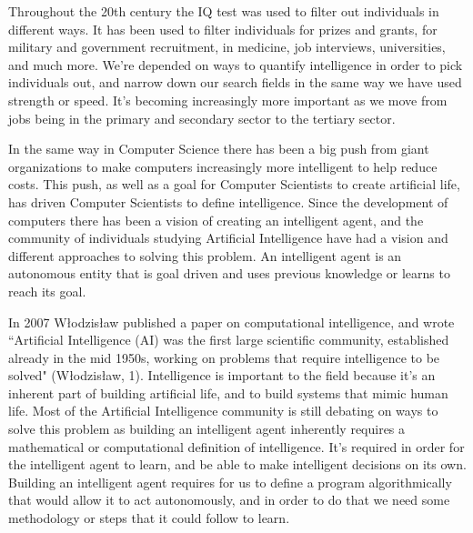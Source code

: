 \documentclass[11pt, oneside]{article}
\begin{document}
\par Throughout the 20th century the IQ test was used to filter out individuals in different ways. It has been used to filter individuals for prizes and grants, for military and government recruitment, in medicine, job interviews, universities, and much more. We're depended on ways to quantify intelligence in order to pick individuals out, and narrow down our search fields in the same way we have used strength or speed. It's becoming increasingly more important as we move from jobs being in the primary and secondary sector to the tertiary sector. 

\par In the same way in Computer Science there has been a big push from giant organizations to make computers increasingly more intelligent to help reduce costs. This push, as well as a goal for Computer Scientists to create artificial life, has driven Computer Scientists to define intelligence. Since the development of computers there has been a vision of creating an intelligent agent, and the community of individuals studying Artificial Intelligence have had a vision and different approaches to solving this problem. An intelligent agent is an autonomous entity that is goal driven and uses previous knowledge or learns to reach its goal.

\par In 2007 W\l{}odzis\l{}aw published a paper on computational intelligence, and wrote ``Artificial Intelligence (AI) was the first large scientific community, established already in the mid 1950s, working on problems that require intelligence to be solved" (W\l{}odzis\l{}aw, 1). Intelligence is important to the field because it's an inherent part of building artificial life, and to build systems that mimic human life. Most of the Artificial Intelligence community is still debating on ways to solve this problem as building an intelligent agent inherently requires a mathematical or computational definition of intelligence. It's required in order for the intelligent agent to learn, and be able to make intelligent decisions on its own. Building an intelligent agent requires for us to define a program algorithmically that would allow it to act autonomously, and in order to do that we need some methodology or steps that it could follow to learn.
\end{document}

